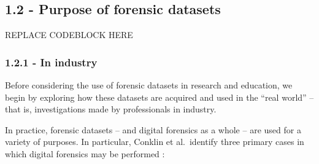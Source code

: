 \subsection{1.2 - Purpose of forensic
datasets}\label{purpose-of-forensic-datasets}

REPLACE CODEBLOCK HERE

\subsubsection{1.2.1 - In industry}\label{in-industry}

Before considering the use of forensic datasets in research and
education, we begin by exploring how these datasets are acquired and
used in the ``real world'' -- that is, investigations made by
professionals in industry.

In practice, forensic datasets -- and digital forensics as a whole --
are used for a variety of purposes. In particular, Conklin et
al.~identify three primary cases in which digital forensics may be
performed \cite{conklinComputerForensics2022}:

